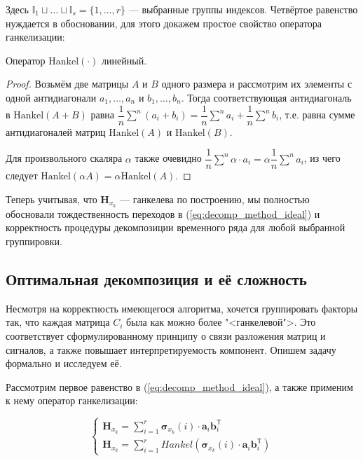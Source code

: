 	    	Здесь $ \mathbb{I}_1 \sqcup \ldots \sqcup \mathbb{I}_s = \{1, \ldots, r\} $ --- выбранные группы индексов. Четвёртое равенство нуждается в обосновании, для этого докажем простое свойство оператора ганкелизации:
	    	
	    	\begin{Lem}
	    		Оператор $ \text{Hankel}(\cdot) $ линейный.
	    	\end{Lem}
	    	
	    	\begin{proof}
	    		Возьмём две матрицы $ A $ и $ B $ одного размера и рассмотрим их элементы с одной антидиагонали $ a_1, \ldots, a_n $ и $ b_1, \ldots, b_n $. Тогда соответствующая антидиагональ в $ \text{Hankel}(A + B) $ равна $ \dfrac{1}{n} \sum\limits^n (a_i + b_i) = \dfrac{1}{n} \sum\limits^n a_i + \dfrac{1}{n} \sum\limits^n b_i $, т.е. равна сумме антидиагоналей матриц $ \text{Hankel}(A) $ и $ \text{Hankel}(B) $.
	    		
	    		Для произвольного скаляра $ \alpha $ также очевидно $ \dfrac{1}{n} \sum\limits^n \alpha \cdot a_i = \alpha \dfrac{1}{n} \sum\limits^n a_i $, из чего следует $ \text{Hankel}(\alpha A) = \alpha \text{Hankel}(A) $.
	    	\end{proof}
	    	
	    	Теперь учитывая, что $ \mathbf{H}_{x_k} $ --- ганкелева по построению, мы полностью обосновали тождественность переходов в (\ref{eq:decomp_method_ideal}) и корректность процедуры декомпозиции временного ряда для любой выбранной группировки.
	    	
	    \subsection*{Оптимальная декомпозиция и её сложность}\label{sec:optimal_decomp}
	    	
	    	Несмотря на корректность имеющегося алгоритма, хочется группировать факторы так, что каждая матрица $ C_i $ была как можно более "<ганкелевой">. Это соответствует сформулированному принципу о связи разложения матриц и сигналов, а также повышает интерпретируемость компонент. Опишем задачу формально и исследуем её.
	    	
	    	Рассмотрим первое равенство в (\ref{eq:decomp_method_ideal}), а также применим к нему оператор ганкелизации:
	    	
	    	\begin{equation*}
	    		\begin{cases*}
	    			\mathbf{H}_{x_k} = \sum\limits_{i = 1}^{r} \boldsymbol{\sigma}_{x_k}(i) \cdot \mathbf{a}_i  \mathbf{b}_i^{\mathsf{T}} \\
	    			\mathbf{H}_{x_k} = \sum\limits_{i = 1}^{r} Hankel(\boldsymbol{\sigma}_{x_k}(i) \cdot \mathbf{a}_i  \mathbf{b}_i^{\mathsf{T}})
	    		\end{cases*}
	    	\end{equation*}
	    	
